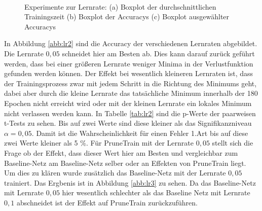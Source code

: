  \begin{figure}
     \centering
     \hfill
     \\
     \caption{Experimente zur Lernrate: (a) Boxplot der durchschnittlichen Trainingszeit (b) Boxplot der Accuracys (c) Boxplot ausgewählter Accuracys}
     \label{abb:lr}
\end{figure}

 In Abbildung \ref{abb:lr2} sind die Accuracy der verschiedenen Lernraten abgebildet. Die Lernrate $0,05$ schneidet hier am Besten ab. Dies kann darauf zurück geführt werden, dass bei einer größeren Lernrate weniger Minima in der Verlustfunktion gefunden werden können. Der Effekt bei wesentlich kleineren Lernraten ist, dass der Trainingsprozess zwar mit jedem Schritt in die Richtung des Minimums geht, dabei aber durch die kleine Lernrate das tatsächliche Minimum innerhalb der 180 Epochen nicht erreicht wird oder mit der kleinen Lernrate ein lokales Minimum nicht verlassen werden kann. In Tabelle \ref{tab:lr2} sind die p-Werte der paarweisen t-Tests zu sehen. Bis auf zwei Werte sind diese kleiner als das Signifikanzniveau $\alpha=0,05$. Damit ist die Wahrscheinlichkeit für einen Fehler 1.Art bis auf diese zwei Werte kleiner als 5 \%. Für PruneTrain mit der Lernrate $0,05$ stellt sich die Frage ob der Effekt, dass dieser Wert hier am Besten und vergleichbar zum Baseline-Netz am Baseline-Netz selber oder an Effekten von PruneTrain liegt. Um dies zu klären wurde zusätzlich das Baseline-Netz mit der Lernrate $0,05$ trainiert. Das Ergbenis ist in Abbildung \ref{abb:lr3} zu sehen. Da das Baseline-Netz mit Lernrate $0,05$ hier wesentlich schlechter als das Baseline Netz mit Lernrate $0,1$ abschneidet ist der Effekt auf PruneTrain zurückzuführen.
 

